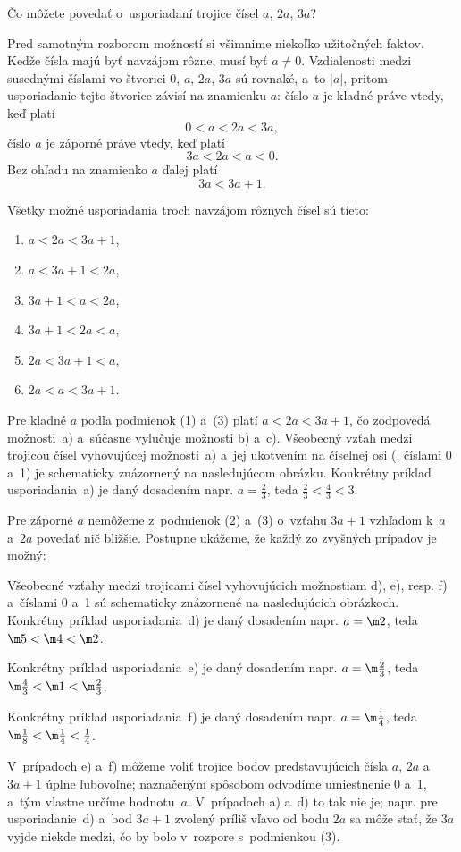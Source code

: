 {%
\napad
Čo môžete povedať o~usporiadaní trojice čísel $a$, $2a$, $3a$?

\riesenie
Pred samotným rozborom možností si všimnime niekoľko užitočných faktov.
Keďže čísla majú byť navzájom rôzne, musí byť $a\ne0$.
Vzdialenosti medzi susednými číslami vo štvorici $0$, $a$, $2a$, $3a$ sú rovnaké, a~to $|a|$, pritom usporiadanie tejto štvorice závisí na znamienku $a$:
číslo $a$ je kladné práve vtedy, keď platí
$$
0<a<2a<3a, \tag{1}
$$
číslo $a$ je záporné práve vtedy, keď platí
$$
3a<2a<a<0. \tag{2}
$$
Bez ohľadu na znamienko $a$ ďalej platí
$$
3a<3a+1. \tag{3}
$$

Všetky možné usporiadania troch navzájom rôznych čísel sú tieto:
\begin{enumerate}\alphatrue
\item $a<2a<3a+1$,
\item $a<3a+1<2a$,
\item $3a+1<a<2a$,
\item $3a+1<2a<a$,
\item $2a<3a+1<a$,
\item $2a<a<3a+1$.
\end{enumerate}

Pre kladné $a$ podľa podmienok (1) a~(3) platí $a<2a<3a+1$, čo zodpovedá možnosti~a) a~súčasne vylučuje možnosti b) a~c).
Všeobecný vzťah medzi trojicou čísel vyhovujúcej možnosti~a) a~jej ukotvením na číselnej osi (\tj. číslami 0 a~1) je schematicky znázornený na nasledujúcom obrázku.
Konkrétny príklad usporiadania~a) je daný dosadením napr. $a=\frac23$, teda $\frac23<\frac43<3$.
%


Pre záporné $a$ nemôžeme z~podmienok (2) a~(3) o~vzťahu $3a+1$ vzhľadom k~$a$ a~$2a$ povedať nič bližšie.
Postupne ukážeme, že každý zo zvyšných prípadov je možný:

Všeobecné vzťahy medzi trojicami čísel vyhovujúcich možnostiam d), e), resp. f) a~číslami 0 a~1 sú schematicky znázornené na nasledujúcich obrázkoch.
Konkrétny príklad usporiadania~d) je daný dosadením napr. $a=\m2$, teda $\m5<\m4<\m2$.
%


\noindent
Konkrétny príklad usporiadania~e) je daný dosadením napr. $a=\m\frac23$, teda $\m\frac43<\m1<\m\frac23$.
%


\noindent
Konkrétny príklad usporiadania~f) je daný dosadením napr. $a=\m\frac14$, teda $\m\frac18<\m\frac14<\frac14$.
%


\poznamka
V~prípadoch e) a~f) môžeme voliť trojice bodov predstavujúcich čísla $a$, $2a$ a~$3a+1$ úplne ľubovoľne; naznačeným spôsobom odvodíme umiestnenie 0 a~1, a~tým vlastne určíme hodnotu~$a$.
V~prípadoch a) a~d) to tak nie je;
napr. pre usporiadanie~d) a~bod $3a+1$ zvolený príliš vľavo od bodu $2a$ sa môže stať, že $3a$ vyjde niekde medzi, čo by bolo v~rozpore s~podmienkou (3).

}
